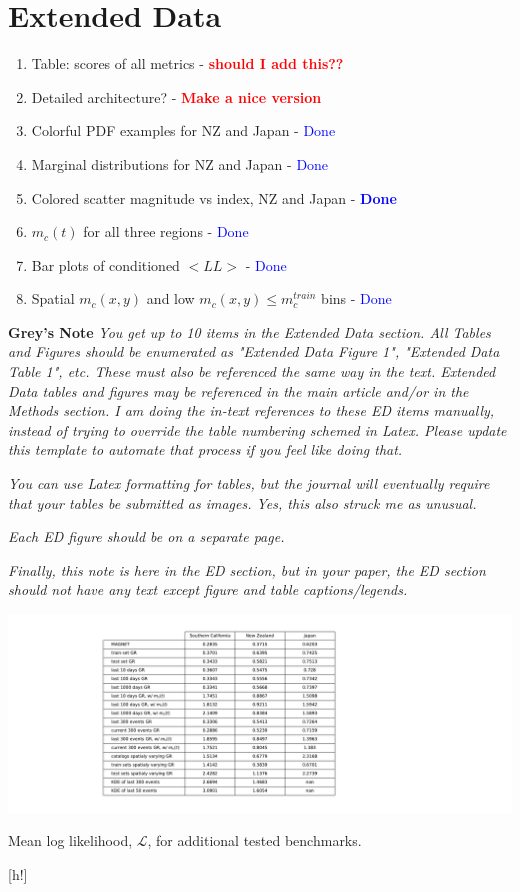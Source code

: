 \documentclass[pdflatex]{sn-jnl}
\begin{document}
\section*{Extended Data}
\begin{enumerate}
    \item Table: scores of all metrics - \textcolor{red}{\textbf{should I add this??}}
    \item Detailed architecture? - \textcolor{red}{\textbf{Make a nice version}}
    \item Colorful PDF examples for NZ and Japan - \textcolor{blue}{Done}
    \item Marginal distributions for NZ and Japan - \textcolor{blue}{Done}
    \item Colored scatter magnitude vs index, NZ and Japan - \textcolor{blue}{\textbf{Done}}
    \item $m_c(t)$ for all three regions - \textcolor{blue}{Done}
    \item Bar plots of conditioned $<LL>$ - \textcolor{blue}{Done}
    \item Spatial $m_c(x, y)$ and low $m_c(x, y) \leq m_c^{train}$ bins - \textcolor{blue}{Done}
\end{enumerate}

\textbf{Grey's Note} \textit{You get up to 10 items in the Extended Data section. All Tables and Figures should be enumerated as "Extended Data Figure 1", "Extended Data Table 1", etc. These must also be referenced the same way in the text. Extended Data tables and figures may be referenced in the main article and/or in the Methods section. I am doing the in-text references to these ED items manually, instead of trying to override the table numbering schemed in Latex. Please update this template to automate that process if you feel like doing that.}

\textit{You can use Latex formatting for tables, but the journal will eventually require that your tables be submitted as images. Yes, this also struck me as unusual.}

\textit{Each ED figure should be on a separate page.}

\textit{Finally, this note is here in the ED section, but in your paper, the ED section should not have any text except figure and table captions/legends.}

\newpage
\begin{table}[]
    \centering
    \includegraphics[width=1\textwidth]{figures/mean_ll_table.pdf}
    \caption{Mean log likelihood, $\mathcal{L}$, for additional tested benchmarks.}
    \label{tab:mean_ll_all_benchmarks}
\end{table}[h!]
\end{document}
